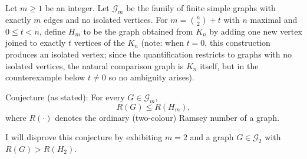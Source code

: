Let $m\ge 1$ be an integer. Let $\mathcal{G}_m$ be the family of finite simple graphs with exactly $m$ edges and no isolated vertices. For $m=\binom{n}{2}+t$ with $n$ maximal and $0\le t < n$, define $H_m$ to be the graph obtained from $K_n$ by adding one new vertex joined to exactly $t$ vertices of the $K_n$ (note: when $t=0$, this construction produces an isolated vertex; since the quantification restricts to graphs with no isolated vertices, the natural comparison graph is $K_n$ itself, but in the counterexample below $t\neq 0$ so no ambiguity arises).

Conjecture (as stated): For every $G\in\mathcal{G}_m$,
\[
R(G)\le R(H_m),
\]
where $R(\cdot)$ denotes the ordinary (two-colour) Ramsey number of a graph.

I will disprove this conjecture by exhibiting $m=2$ and a graph $G\in\mathcal{G}_2$ with $R(G)>R(H_2)$.
